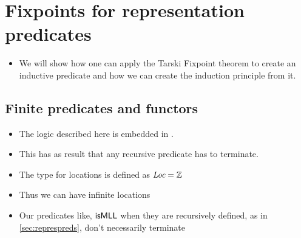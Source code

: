 \documentclass[thesis.tex]{subfiles}
\begin{document}
\chapter{Fixpoints for representation predicates}
\label{ch:fixpoints}
\begin{itemize}
    \item We will show how one can apply the Tarski Fixpoint theorem to create an inductive predicate and how we can create the induction principle from it.
\end{itemize}
\section{Finite predicates and functors}
\begin{itemize}
    \item The logic described here is embedded in \coq.
    \item This has as result that any recursive predicate has to terminate.
    \item The type for locations is defined as $\kern-0.05em\textit{Loc} = \mathbb{Z}$
    \item Thus we can have infinite locations
    \item Our predicates like, $\textsf{\upshape isMLL}$ when they are recursively defined, as in \cref*{sec:represpreds}, don't necessarily terminate
\end{itemize}
\end{document}
